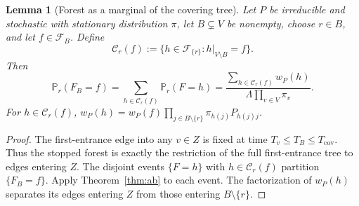 \documentclass[11pt]{article}
\newtheorem{lemma}[definition]{Lemma}
\begin{document}
\begin{lemma}[Forest as a marginal of the covering tree]
\label{lem:forest-marginal}
Let $P$ be irreducible and stochastic with stationary
distribution $\pi$, let $B\subsetneq V$ be nonempty, choose
$r\in B$, and let $f\in\mathcal F_B$. Define
\[
\mathcal C_r(f)
:=\{h\in\mathcal F_{\{r\}}:
   h|_{V\setminus B}=f\}.
\]
Then
\begin{equation}\label{eq:forest-marginal}
\mathbb P_r(F_B=f)
=\sum_{h\in\mathcal C_r(f)}\mathbb P_r(F=h)
=\frac{\displaystyle\sum_{h\in\mathcal C_r(f)}w_P(h)}
 {\displaystyle\Lambda\prod_{v\in V}\pi_v}.
\end{equation}
For $h\in\mathcal C_r(f)$,
$w_P(h)=w_P(f)\prod_{j\in B\setminus\{r\}}
\pi_{h(j)}P_{h(j)j}$.
\end{lemma}
\begin{proof}
The first-entrance edge into any $v\in Z$ is fixed at time
$T_v\leq T_B\leq T_{\mathrm{cov}}$. Thus the stopped forest is
exactly the restriction of the full first-entrance tree to edges
entering $Z$. The disjoint events $\{F=h\}$ with
$h\in\mathcal C_r(f)$ partition $\{F_B=f\}$.
Apply Theorem~\ref{thm:ab} to each event. The factorization of
$w_P(h)$ separates its edges entering $Z$ from those entering
$B\setminus\{r\}$.
\end{proof}
\end{document}
